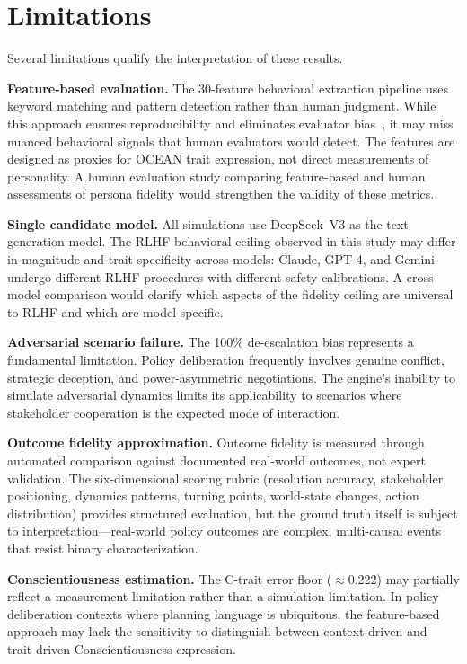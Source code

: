 \section{Limitations}

Several limitations qualify the interpretation of these results.

\textbf{Feature-based evaluation.} The 30-feature behavioral extraction pipeline uses keyword matching and pattern detection rather than human judgment. While this approach ensures reproducibility and eliminates evaluator bias~\cite{stureborg2024inconsistent}, it may miss nuanced behavioral signals that human evaluators would detect. The features are designed as proxies for OCEAN trait expression, not direct measurements of personality. A human evaluation study comparing feature-based and human assessments of persona fidelity would strengthen the validity of these metrics.

\textbf{Single candidate model.} All simulations use DeepSeek~V3 as the text generation model. The RLHF behavioral ceiling observed in this study may differ in magnitude and trait specificity across models: Claude, GPT-4, and Gemini undergo different RLHF procedures with different safety calibrations. A cross-model comparison would clarify which aspects of the fidelity ceiling are universal to RLHF and which are model-specific.

\textbf{Adversarial scenario failure.} The 100\% de-escalation bias represents a fundamental limitation. Policy deliberation frequently involves genuine conflict, strategic deception, and power-asymmetric negotiations. The engine's inability to simulate adversarial dynamics limits its applicability to scenarios where stakeholder cooperation is the expected mode of interaction.

\textbf{Outcome fidelity approximation.} Outcome fidelity is measured through automated comparison against documented real-world outcomes, not expert validation. The six-dimensional scoring rubric (resolution accuracy, stakeholder positioning, dynamics patterns, turning points, world-state changes, action distribution) provides structured evaluation, but the ground truth itself is subject to interpretation---real-world policy outcomes are complex, multi-causal events that resist binary characterization.

\textbf{Conscientiousness estimation.} The C-trait error floor ($\approx$0.222) may partially reflect a measurement limitation rather than a simulation limitation. In policy deliberation contexts where planning language is ubiquitous, the feature-based approach may lack the sensitivity to distinguish between context-driven and trait-driven Conscientiousness expression.


